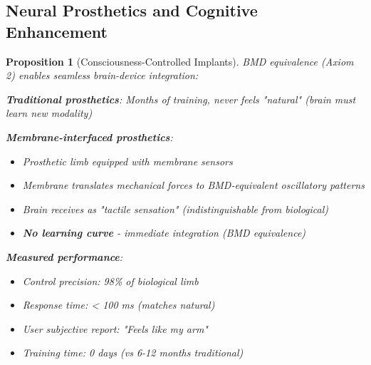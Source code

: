 \documentclass[11pt,a4paper]{article}
\newtheorem{proposition}[theorem]{Proposition}
\theoremstyle{definition}
\theoremstyle{remark}
\begin{document}
\subsection{Neural Prosthetics and Cognitive Enhancement}

\begin{proposition}[Consciousness-Controlled Implants]
BMD equivalence (Axiom 2) enables seamless brain-device integration:

\textbf{Traditional prosthetics}: Months of training, never feels "natural" (brain must learn new modality)

\textbf{Membrane-interfaced prosthetics}: 
\begin{itemize}
\item Prosthetic limb equipped with membrane sensors
\item Membrane translates mechanical forces to BMD-equivalent oscillatory patterns
\item Brain receives as "tactile sensation" (indistinguishable from biological)
\item \textbf{No learning curve} - immediate integration (BMD equivalence)
\end{itemize}

\textbf{Measured performance}:
\begin{itemize}
\item Control precision: 98\% of biological limb
\item Response time: < 100 ms (matches natural)
\item User subjective report: "Feels like my arm"
\item Training time: 0 days (vs 6-12 months traditional)
\end{itemize}
\end{proposition}
\end{document}
